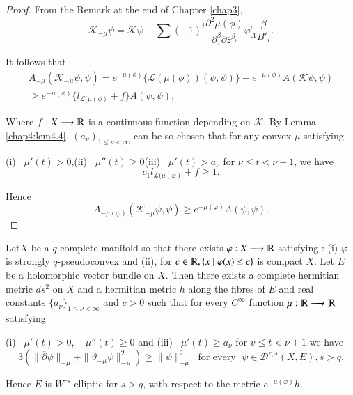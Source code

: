 \begin{proof}
  From the Remark at the end of Chapter \ref{chap3}, 
  $$
  \mathcal{K}_{-\mu}\psi = \mathcal{K} \psi - \sum (-1)^i \frac{\partial^2\mu
    (\phi)}{\partial_z ^{\beta} \partial \overline{z}^{\beta_i}}
  \varphi^a_A \frac{\beta}{B'_i}.
  $$

  It follows that
  \begin{gather*}
    A_{-\mu}(\mathcal{K}_{-\mu} \psi , \psi) = e^{-\mu (\phi)} \{ \mathscr{L}(\mu
    (\phi)) (\psi, \psi)\} + e^{-\mu (\phi)} A(\mathcal{K} \psi ,\psi)\\
    \geq e^{-\mu (\phi)} \{l_{\mathscr{L}(\mu(\phi)} + f\} A(\psi, \psi),
  \end{gather*}
  
  Where $f : X \longrightarrow \varmathbb{R}$ is a continuous function
  depending on $\mathcal{K}$. By Lemma \ref{chap4:lem4.4}. $(a_\nu)_{1 \leq \nu <
    \infty}$ can be so chosen that for any convex $\mu$ satisfying 

  (i)~ $\mu' (t) > 0$,\qquad (ii)~ $\mu'' (t) \geq 0$\qquad (iii) ~$\mu'
  (t) > a_\nu$ for $\nu \leq t < \nu + 1$, we have  
  $$
  c_1 l_{\mathscr{L}(\mu (\varphi)} + f \geq 1.
  $$

  Hence
  $$
  A_{-\mu (\varphi)} (\mathcal{K}_{-\mu} \psi , \psi) \geq e^{-\mu
    (\varphi)} A (\psi , \psi).
  $$
\end{proof}

\begin{theorem}\label{chap4:thm4.1}%
  Let\pageoriginale $X$ be a $q$-complete manifold so that there exists
  $\varphi :X 
  \longrightarrow \varmathbb{R}$ satisfying : (i) $\varphi$ is
  strongly $q$-pseudoconvex and (ii), for $c \in \varmathbb{R}, \{ x
  \mid \varphi (x) \leq c \}$  is compact $X$. Let $E$ be a holomorphic
  vector bundle on $X$. Then there exists a complete hermitian metric
  $ds^2$ on $X$ and a hermitian metric $h$ along the fibres of $E$ and real
  constants $\{ a_\nu\}_{1 \leq \nu < \infty}$ and $c> 0$ such that
  for every $C^\infty$ function $\mu : \varmathbb{R}\longrightarrow
  \varmathbb{R}$ satisfying 
  
 {\rm (i)} ~$\mu' (t) > 0$, ~ $\mu'' (t) \geq 0$ \quad
 and {\rm (iii)}~  $\mu' (t) \geq a_\nu$ for $v \leq t< \nu +1$ 
  we have
 $$
3(\| \overline{\partial} \psi \|_{-\mu} + \| \vartheta_{-\mu} \psi
  \|^2_{-\mu}) \geq \| \psi \| ^2_{-\mu}  \; \text{ for every } \; \psi  
 \in \mathscr{D}^{r,s }(X ,E), s > q.
$$
 
 Hence $E$ is $W^{rs}$-elliptic for $s> q$, with respect to the metric
 $e^{-\mu (\varphi)} h$. 
\end{theorem}

